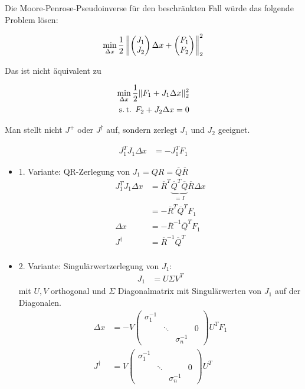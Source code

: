 
Die Moore-Penrose-Pseudoinverse für den beschränkten Fall würde das folgende Problem lösen:

\begin{align*}
\min_{\Delta x} \frac 12 \left\| \begin{pmatrix} J_1 \\ J_2 \end{pmatrix} \Delta x + \begin{pmatrix} F_1 \\ F_2 \end{pmatrix} \right\|_2^2
\end{align*}

Das ist nicht äquivalent zu 

\begin{align*}
\min_{\Delta x} \frac 12 \| F_1 + J_1 \Delta x \|_2^2 \\
\text{s.\,t. } F_2 + J_2 \Delta x = 0
\end{align*}


Man stellt nicht $J^+$ oder $J^\dagger$ auf, sondern zerlegt $J_1$ und $J_2$ geeignet.


\begin{align*}
J_1^T J_1 \Delta x &= -J_1^T F_1
\end{align*}

\begin{itemize}
\item 1. Variante: QR-Zerlegung von $J_1 = QR = \overline Q \overline R$
\begin{align*}
J_1^T J_1 \Delta x &= \overline R^T \underbrace{\overline Q^T \overline Q}_{=I} \overline R \Delta x \\
&= - \overline R^T \overline Q^T F_1 \\
\Delta x &= -\overline R^{-1} \overline Q^T F_1 \\
J^\dagger &= \overline R^{-1} \overline Q^T \\
\end{align*}
\item 2. Variante: Singulärwertzerlegung von $J_1$:
\begin{align*}
J_1 &= U \Sigma V^T
\end{align*}
mit $U,V$ orthogonal und $\Sigma$ Diagonalmatrix mit Singulärwerten von $J_1$ auf der Diagonalen.
\begin{align*}
\Delta x &= - V \begin{pmatrix} \sigma_1^{-1} \\ & \ddots & & 0 \\ & & \sigma_n^{-1} \end{pmatrix} U^T F_1 \\
J^\dagger &= V \begin{pmatrix} \sigma_1^{-1} \\ & \ddots & & 0 \\ & & \sigma_n^{-1} \end{pmatrix} U^T \\
\end{align*}
\end{itemize}

